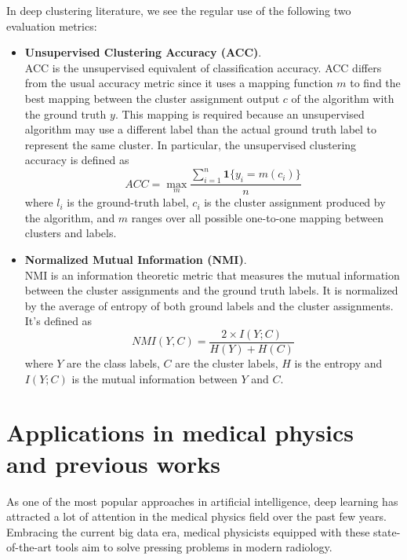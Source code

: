 In deep clustering literature, we see the regular use of the following two evaluation metrics:

\begin{itemize}
    \item \textbf{Unsupervised Clustering Accuracy (ACC)}. \\ ACC is the unsupervised equivalent of classification accuracy. ACC differs from the usual accuracy metric since it uses a mapping function $m$ to find the best mapping between the cluster assignment output $c$ of the algorithm with the ground truth $y$. This mapping is required because an unsupervised algorithm may use a different label than the actual ground truth label to represent the same cluster. In particular, the unsupervised clustering accuracy is defined as
        \begin{equation}
            ACC = \max_m \frac{\sum_{i=1}^n \textbf{1}\{y_i=m(c_i)\}}{n}
        \end{equation}
        where $l_i$ is the ground-truth label, $c_i$ is the cluster assignment produced by the algorithm, and $m$ ranges over all possible one-to-one mapping between clusters and labels.
    
    \item \textbf{Normalized Mutual Information (NMI)}. \\
    NMI is an information theoretic metric that measures the mutual information between the cluster assignments and the ground truth labels. It is normalized by the average of entropy of both ground labels and the cluster assignments. It's defined as
    \begin{equation}
        NMI(Y,C) = \frac{2 \times I(Y;C)}{H(Y) + H(C)}
    \end{equation}
    where $Y$ are the class labels, $C$ are the cluster labels, $H$ is the entropy and $I(Y;C)$ is the mutual information between $Y$ and $C$.
\end{itemize}


\section{Applications in medical physics and previous works}

As one of the most popular approaches in artificial intelligence, deep learning has attracted a lot of attention in the medical physics field over the past few years. Embracing the current big data era, medical physicists equipped with these state-of-the-art tools aim to solve pressing problems in modern radiology. 

